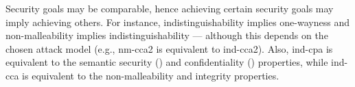 Security goals may be comparable, hence achieving certain security goals may imply achieving others. For instance, indistinguishability implies one-wayness and non-malleability implies indistinguishability --- although this depends on the chosen attack model (e.g., \gls{nm}-\gls{cca2} is equivalent to \gls{ind}-\gls{cca2}). Also, \gls{ind}-\gls{cpa} is equivalent to the semantic security () and confidentiality () properties, while \gls{ind}-\gls{cca} is equivalent to the non-malleability and integrity properties.
